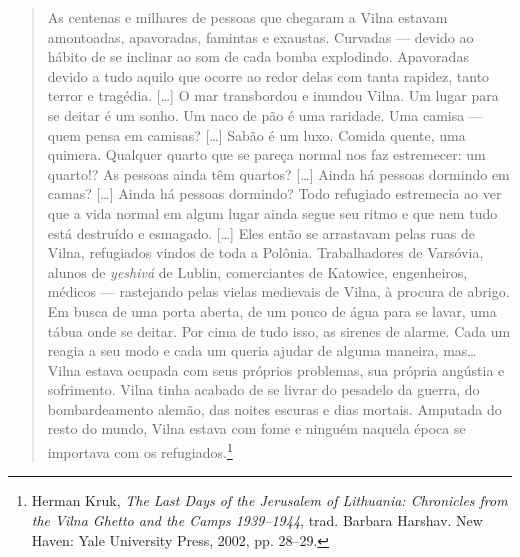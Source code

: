 \begin{quote}
As centenas e milhares de pessoas que chegaram a Vilna estavam
amontoadas, apavoradas, famintas e exaustas. Curvadas --- devido ao hábito
de se inclinar ao som de cada bomba explodindo. Apavoradas devido a tudo
aquilo que ocorre ao redor delas com tanta rapidez, tanto terror e
tragédia. [\ldots{}] O mar transbordou e inundou Vilna. Um lugar para se
deitar é um sonho. Um naco de pão é uma raridade. Uma camisa --- quem
pensa em camisas? [\ldots{}] Sabão é um luxo. Comida quente, uma quimera.
Qualquer quarto que se pareça normal nos faz estremecer: um quarto!? As
pessoas ainda têm quartos? [\ldots{}] Ainda há pessoas dormindo em camas?
[\ldots{}] Ainda há pessoas dormindo? Todo refugiado estremecia ao ver que
a vida normal em algum lugar ainda segue seu ritmo e que nem tudo está
destruído e esmagado. [\ldots{}] Eles então se arrastavam pelas ruas de
Vilna, refugiados vindos de toda a Polônia. Trabalhadores de Varsóvia,
alunos de \textit{yeshivá} de Lublin, comerciantes de Katowice, engenheiros,
médicos --- rastejando pelas vielas medievais de Vilna, à procura de
abrigo. Em busca de uma porta aberta, de um pouco de água para se lavar,
uma tábua onde se deitar. Por cima de tudo isso, as sirenes de alarme.
Cada um reagia a seu modo e cada um queria ajudar de alguma maneira,
mas\ldots{} Vilna estava ocupada com seus próprios problemas, sua
própria angústia e sofrimento. Vilna tinha acabado de se livrar do
pesadelo da guerra, do bombardeamento alemão, das noites escuras e dias
mortais. Amputada do resto do mundo, Vilna estava com fome e ninguém
naquela época se importava com os refugiados.\footnote{Herman Kruk, \textit{The Last Days of the Jerusalem of Lithuania: Chronicles from the Vilna Ghetto and the Camps 1939--1944}, trad. Barbara Harshav. New Haven: Yale University Press, 2002, pp. 28--29.}
\end{quote}

